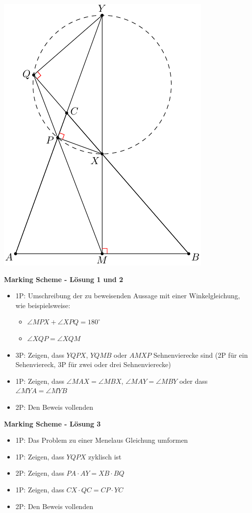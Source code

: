{\begin{center}
\includegraphics{g2fig}
\end{center}

\bigskip

\textbf{Marking Scheme - Lösung 1 und 2}
\begin{itemize}
    \item 1P: Umschreibung der zu beweisenden Aussage mit einer Winkelgleichung, wie beispielsweise:
    \begin{itemize}
        \item $\angle MPX+\angle XPQ=180^\circ$
        \item $\angle XQP=\angle XQM$
    \end{itemize}
    \item 3P: Zeigen, dass $YQPX$, $YQMB$ oder $AMXP$ Sehnenvierecke sind (2P für ein Sehenviereck, 3P für zwei oder drei Sehnenvierecke)
    \item 1P: Zeigen, dass $\angle MAX=\angle MBX$, $\angle MAY=\angle MBY$ oder dass $\angle MYA=\angle MYB$
    \item 2P: Den Beweis vollenden
\end{itemize}

\textbf{Marking Scheme - Lösung 3}

\begin{itemize}
    \item 1P: Das Problem zu einer Menelaus Gleichung umformen
    \item 1P: Zeigen, dass $YQPX$ zyklisch ist
    \item 2P: Zeigen, dass $PA\cdot AY=XB\cdot BQ$
    \item 1P: Zeigen, dass $CX\cdot QC=CP\cdot YC$
    \item 2P: Den Beweis vollenden
\end{itemize}
}




